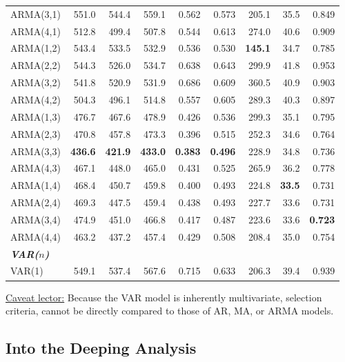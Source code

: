 \documentclass{Configuration_Files/PoliMi3i_thesis}
\begin{document}
\begin{table}[H]
\begin{tabular}{@{}lrrrrrrrr@{}}
    ARMA(3,1) & 551.0 & 544.4 & 559.1 & 0.562 & 0.573 & 205.1 & 35.5 & 0.849 \\
    ARMA(4,1) & 512.8 & 499.4 & 507.8 & 0.544 & 0.613 & 274.0 & 40.6 & 0.909 \\
    ARMA(1,2) & 543.4 & 533.5 & 532.9 & 0.536 & 0.530 & \textbf{145.1} & 34.7 & 0.785 \\
    ARMA(2,2) & 544.3 & 526.0 & 534.7 & 0.638 & 0.643 & 299.9 & 41.8 & 0.953 \\
    ARMA(3,2) & 541.8 & 520.9 & 531.9 & 0.686 & 0.609 & 360.5 & 40.9 & 0.903 \\
    ARMA(4,2) & 504.3 & 496.1 & 514.8 & 0.557 & 0.605 & 289.3 & 40.3 & 0.897 \\
    ARMA(1,3) & 476.7 & 467.6 & 478.9 & 0.426 & 0.536 & 299.3 & 35.1 & 0.795 \\
    ARMA(2,3) & 470.8 & 457.8 & 473.3 & 0.396 & 0.515 & 252.3 & 34.6 & 0.764 \\
    \rowcolor{gray!20}
    ARMA(3,3) & \textbf{436.6} & \textbf{421.9} & \textbf{433.0} 
           & \textbf{0.383} & \textbf{0.496} & 228.9 & 34.8 & 0.736 \\
    ARMA(4,3) & 467.1 & 448.0 & 465.0 & 0.431 & 0.525 & 265.9 & 36.2 & 0.778 \\
    ARMA(1,4) & 468.4 & 450.7 & 459.8 & 0.400 & 0.493 & 224.8 & \textbf{33.5} & 0.731 \\
    ARMA(2,4) & 469.3 & 447.5 & 459.4 & 0.438 & 0.493 & 227.7 & 33.6 & 0.731 \\
    ARMA(3,4) & 474.9 & 451.0 & 466.8 & 0.417 & 0.487 & 223.6 & 33.6 & \textbf{0.723} \\
    ARMA(4,4) & 463.2 & 437.2 & 457.4 & 0.429 & 0.508 & 208.4  & 35.0 & 0.754 \\
    \midrule
    \midrule
\textbf{\textit{VAR($n$)}}\\    VAR(1)
      & 549.1 & 537.4 & 567.6 & 0.715 & 0.633 & 206.3 & 39.4 & 0.939 \\
    \bottomrule
  \end{tabular}
\end{table}

\underline{Caveat lector:} Because the VAR model is inherently multivariate, selection criteria, cannot be directly compared to those of AR, MA, or ARMA models. 

\newpage
\subsection{Into the Deeping Analysis}
\end{document}
